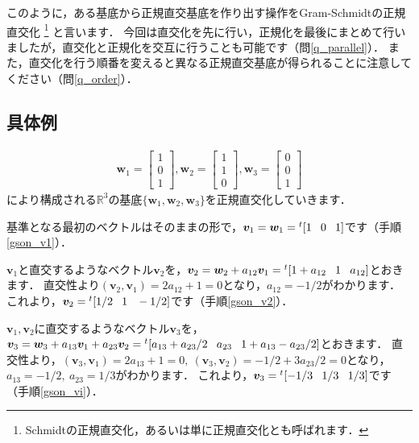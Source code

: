 \documentclass[dvipdfmx]{jsarticle}
\theoremstyle{definition}
\newcommand{\tp}[1]{{}^{t}#1}
\newcommand{\hs}[1]{\hspace{#1em}}
\newcommand{\tpv}[3]{\tp{[#1 \hs{0.8} #2 \hs{0.8} #3]}}
\begin{document}
このように，ある基底から正規直交基底を作り出す操作をGram-Schmidtの正規直交化
\footnote{
    Schmidtの正規直交化，あるいは単に正規直交化とも呼ばれます．
}
と言います．
今回は直交化を先に行い，正規化を最後にまとめて行いましたが，直交化と正規化を交互に行うことも可能です（問\ref{q_parallel}）．
また，直交化を行う順番を変えると異なる正規直交基底が得られることに注意してください（問\ref{q_order}）．


\subsection{具体例} \label{subsec_gson_ex}
\begin{align*}
    \bm{w}_1 = \begin{bmatrix} 1 \\ 0 \\ 1 \end{bmatrix},
    \bm{w}_2 = \begin{bmatrix} 1 \\ 1 \\ 0 \end{bmatrix},
    \bm{w}_3 = \begin{bmatrix} 0 \\ 0 \\ 1 \end{bmatrix}
\end{align*}
により構成される$\mathbb{R}^3$の基底$\{ \bm{w}_1, \bm{w}_2, \bm{w}_3 \}$を正規直交化していきます．

基準となる最初のベクトルはそのままの形で，$\bm{v}_1 = \bm{w}_1 = \tpv{1}{0}{1}$です（手順\ref{gson_v1}）．

$\bm{v}_1$と直交するようなベクトル$\bm{v}_2$を，$\bm{v}_2 = \bm{w}_2 + a_{12}\bm{v}_1 = \tpv{1+a_{12}}{1}{a_{12}}$とおきます．
直交性より$(\bm{v}_2, \bm{v}_1) = 2 a_{12} + 1 = 0$となり，$a_{12} = -1/2$がわかります．
これより，$\bm{v}_2 = \tpv{1/2}{1}{-1/2}$です（手順\ref{gson_v2}）．

$\bm{v}_1, \bm{v}_2$に直交するようなベクトル$\bm{v}_3$を，
$\bm{v}_3 = \bm{w}_3 + a_{13}\bm{v}_1 + a_{23}\bm{v}_2 = \tpv{a_{13}+a_{23}/2}{a_{23}}{1+a_{13}-a_{23}/2}$とおきます．
直交性より，$(\bm{v}_3, \bm{v}_1) = 2 a_{13} + 1 = 0, \ (\bm{v}_3, \bm{v}_2) = -1/2 + 3a_{23}/2 = 0$となり，
$a_{13} = -1/2, \ a_{23} = 1/3$がわかります．
これより，$\bm{v}_3 = \tpv{-1/3}{1/3}{1/3}$です（手順\ref{gson_vi}）．
\end{document}
